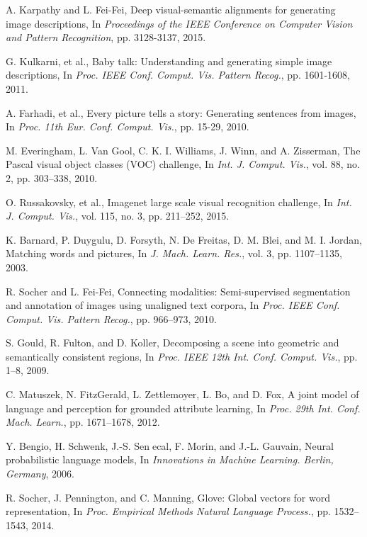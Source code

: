 \documentclass[10pt,twocolumn,letterpaper]{article}
\begin{document}
\begin{itemize}
\begin{thebibliography}{99}
A. Karpathy and L. Fei-Fei, Deep visual-semantic alignments for generating image descriptions,
In \textit{Proceedings of the IEEE Conference on Computer Vision and Pattern Recognition}, pp. 3128-3137, 2015.

G. Kulkarni, et al., Baby talk: Understanding and generating simple image descriptions,
In \textit{Proc. IEEE Conf. Comput. Vis. Pattern Recog.}, pp. 1601-1608, 2011.

A. Farhadi, et al., Every picture tells a story: Generating sentences from images,
In \textit{Proc. 11th Eur. Conf. Comput. Vis.}, pp. 15-29, 2010.

M. Everingham, L. Van Gool, C. K. I. Williams, J. Winn, and A. Zisserman, The Pascal visual object classes (VOC) challenge,
In \textit{Int. J. Comput. Vis.}, vol. 88, no. 2, pp. 303–338, 2010.

O. Russakovsky, et al., Imagenet large scale visual recognition challenge,
In \textit{Int. J. Comput. Vis.}, vol. 115, no. 3, pp. 211–252, 2015.

K. Barnard, P. Duygulu, D. Forsyth, N. De Freitas, D. M. Blei, and M. I. Jordan, Matching words and pictures,
In \textit{J. Mach. Learn. Res.}, vol. 3, pp. 1107–1135, 2003.

R. Socher and L. Fei-Fei, Connecting modalities: Semi-supervised segmentation and annotation of images using unaligned text corpora,
In \textit{Proc. IEEE Conf. Comput. Vis. Pattern Recog.}, pp. 966–973, 2010.

S. Gould, R. Fulton, and D. Koller, Decomposing a scene into geometric and semantically consistent regions,
In \textit{Proc. IEEE 12th Int. Conf. Comput. Vis.}, pp. 1–8, 2009.

C. Matuszek, N. FitzGerald, L. Zettlemoyer, L. Bo, and D. Fox, A joint model of language and perception for grounded attribute learning,
In \textit{Proc. 29th Int. Conf. Mach. Learn.}, pp. 1671–1678, 2012.

Y. Bengio, H. Schwenk, J.-S. Senecal, F. Morin, and J.-L. Gauvain, Neural probabilistic language models,
In \textit{Innovations in Machine Learning. Berlin, Germany}, 2006.

R. Socher, J. Pennington, and C. Manning, Glove: Global vectors for word representation,
In \textit{Proc. Empirical Methods Natural Language Process.}, pp. 1532–1543, 2014.


\end{thebibliography}
\end{itemize}
\end{document}
